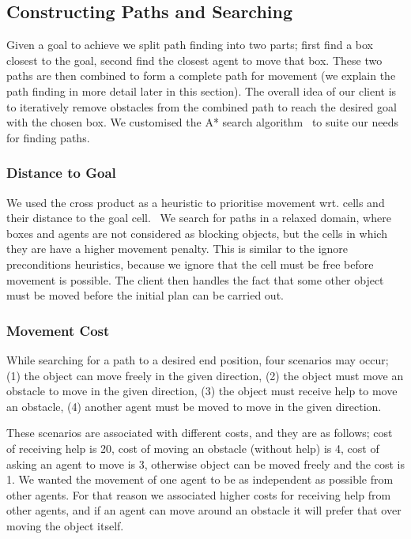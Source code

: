 \subsection{Constructing Paths and Searching}
\label{sec:constructing paths and searching}

Given a goal to achieve we split path finding into two parts; first find a box closest to the goal, second find the closest agent to move that box.
These two paths are then combined to form a complete path for movement (we explain the path finding in more detail later in this section).
The overall idea of our client is to iteratively remove obstacles from the combined path to reach the desired goal with the chosen box.
We customised the A* search algorithm~\cite{pathfinding2016redblobgames} to suite our needs for finding paths.

\subsubsection{Distance to Goal}

We used the cross product as a heuristic to prioritise movement wrt. cells and their distance to the goal cell.~\cite{pathfinding2016redblobgames}
We search for paths in a relaxed domain, where boxes and agents are not considered as blocking objects, but the cells in which they are have a higher movement penalty.
This is similar to the ignore preconditions heuristics, because we ignore that the cell must be free before movement is possible.
The client then handles the fact that some other object must be moved before the initial plan can be carried out.

\subsubsection{Movement Cost}

While searching for a path to a desired end position, four scenarios may occur; (1) the object can move freely in the given direction, (2) the object must move an obstacle to move in the given direction, (3) the object must receive help to move an obstacle, (4) another agent must be moved to move in the given direction.

These scenarios are associated with different costs, and they are as follows; cost of receiving help is 20, cost of moving an obstacle (without help) is 4, cost of asking an agent to move is 3, otherwise object can be moved freely and the cost is 1.
We wanted the movement of one agent to be as independent as possible from other agents.
For that reason we associated higher costs for receiving help from other agents, and if an agent can move around an obstacle it will prefer that over moving the object itself.

